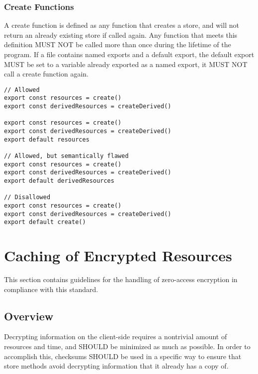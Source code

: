 \documentclass{article}
\begin{document}
\subsubsection{Create Functions}
A create function is defined as any function that creates a store, and will not return an already existing store if called again. Any function that meets this definition MUST NOT be called more than once during the lifetime of the program. If a file contains named exports and a default export, the default export MUST be set to a variable already exported as a named export, it MUST NOT call a create function again. 

\begin{lstlisting}[caption=Usage of Create Functions and Named Exports]
// Allowed
export const resources = create()
export const derivedResources = createDerived()

export const resources = create()
export const derivedResources = createDerived()
export default resources

// Allowed, but semantically flawed
export const resources = create()
export const derivedResources = createDerived()
export default derivedResources

// Disallowed
export const resources = create()
export const derivedResources = createDerived()
export default create()
\end{lstlisting}

\section{Caching of Encrypted Resources}
This section contains guidelines for the handling of zero-access encryption in compliance with this standard.

\subsection{Overview}
Decrypting information on the client-side requires a nontrivial amount of resources and time, and SHOULD be minimized as much as possible. In order to accomplish this, checksums SHOULD be used in a specific way to ensure that store methods avoid decrypting information that it already has a copy of.
\end{document}
